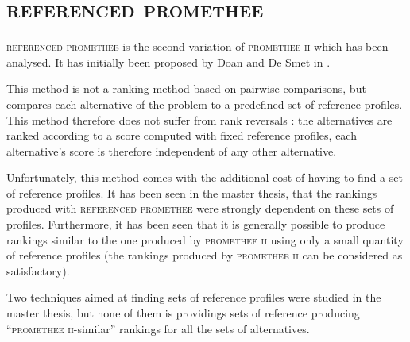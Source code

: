 \documentclass[conference,compsoc]{IEEEtran}
\begin{document}
\section{\textsc{referenced promethee}}

\textsc{referenced promethee} is the second variation of \textsc{promethee ii} which has been analysed.
It has initially been proposed by Doan and De Smet in \cite{RefPII}.

This method is not a ranking method based on pairwise comparisons, but compares each alternative of the problem to a predefined set of reference profiles.
This method therefore does not suffer from rank reversals : the alternatives are ranked according to a score computed with fixed reference profiles, each alternative's score is therefore independent of any other alternative.

Unfortunately, this method comes with the additional cost of having to find a set of reference profiles. 
It has been seen in the master thesis, that the rankings produced with \textsc{referenced promethee} were strongly dependent on these sets of profiles. Furthermore, it has been seen that it is generally possible to produce rankings similar to the one produced by \textsc{promethee ii} using only a small quantity of reference profiles (the rankings produced by \textsc{promethee ii} can be considered as satisfactory).

Two techniques aimed at finding sets of reference profiles were studied in the master thesis, but none of them is providings sets of reference producing ``\textsc{promethee ii}-similar'' rankings for all the sets of alternatives.


%
%
\end{document}
